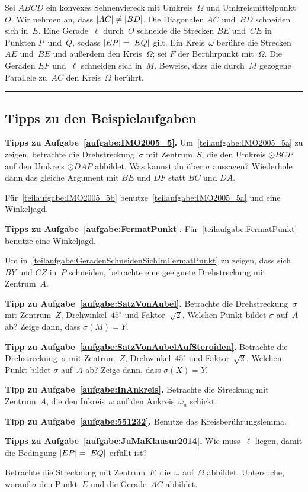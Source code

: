 \begin{aufgabe*}\label{aufgabe:JuMaKlausur2014}
	Sei $ABCD$ ein konvexes Sehnenviereck mit Umkreis~$\Omega$ und Umkreismittelpunkt~$O$. Wir nehmen an, dass $\abs{AC}\neq \abs{BD}$. Die Diagonalen $AC$ und~$BD$ schneiden sich in~$E$. Eine Gerade~$\ell$ durch~$O$ schneide die Strecken $\overline{BE}$ und~$\overline{CE}$ in Punkten $P$~und~$Q$, sodass $\abs{EP}=\abs{EQ}$ gilt. Ein Kreis~$\omega$ berühre die Strecken $\overline{AE}$ und~$\overline{BE}$ und außerdem den Kreis~$\Omega$; sei $F$ der Berührpunkt mit~$\Omega$.
	Die Geraden $EF$ und~$\ell$ schneiden sich in~$M$. Beweise, dass die durch~$M$ gezogene Parallele zu~$AC$ den Kreis~$\Omega$ berührt.
\end{aufgabe*}


\newpage\phantom{newpage}\vfill\hrule\vspace{-1em}
\subsection*{Tipps zu den Beispielaufgaben}

\textbf{Tipps zu Aufgabe~\ref{aufgabe:IMO2005_5}.} Um~\ref{teilaufgabe:IMO2005_5a} zu zeigen, betrachte die Drehstreckung~$\sigma$ mit Zentrum~$S$, die den Umkreis $\odot BCP$ auf den Umkreis $\odot DAP$ abbildet. Was kannst du über $\sigma$ aussagen? Wiederhole dann das gleiche Argument mit $\overline{BE}$ und $\overline{DF}$ statt $\overline{BC}$ und $\overline{DA}$.

Für~\ref{teilaufgabe:IMO2005_5b} benutze~\ref{teilaufgabe:IMO2005_5a} und eine Winkeljagd.

\textbf{Tipps zu Aufgabe~\ref{aufgabe:FermatPunkt}.} Für~\ref{teilaufgabe:FermatPunkt} benutze eine Winkeljagd.

Um in~\ref{teilaufgabe:GeradenSchneidenSichImFermatPunkt} zu zeigen, dass sich $BY$ und $CZ$ in~$P$ schneiden, betrachte eine geeignete Drehstreckung mit Zentrum~$A$.

\textbf{Tipp zu Aufgabe~\ref{aufgabe:SatzVonAubel}.} Betrachte die Drehstreckung~$\sigma$ mit Zentrum~$Z$, Drehwinkel~$45^\circ$ und Faktor~$\sqrt{2}$. Welchen Punkt bildet $\sigma$ auf~$A$ ab? Zeige dann, dass $\sigma(M)=Y$.

\textbf{Tipp zu Aufgabe~\ref{aufgabe:SatzVonAubelAufSteroiden}.} Betrachte die Drehstreckung~$\sigma$ mit Zentrum~$Z$, Drehwinkel~$45^\circ$ und Faktor~$\sqrt{2}$. Welchen Punkt bildet $\sigma$ auf~$A$ ab? Zeige dann, dass $\sigma(X)=Y$.

\textbf{Tipp zu Aufgabe~\ref{aufgabe:InAnkreis}.} Betrachte die Streckung mit Zentrum~$A$, die den Inkreis~$\omega$ auf den Ankreis~$\omega_a$ schickt.

\textbf{Tipp zu Aufgabe~\ref{aufgabe:551232}.} Benutze das Kreisberührungslemma.

\textbf{Tipps zu Aufgabe~\ref{aufgabe:JuMaKlausur2014}.} Wie muss~$\ell$ liegen, damit die Bedingung $\abs*{EP}=\abs*{EQ}$ erfüllt ist?

Betrachte die Strecknung mit Zentrum~$F$, die~$\omega$ auf~$\Omega$ abbildet. Untersuche, worauf $\sigma$ den Punkt~$E$ und die Gerade~$AC$ abbildet.